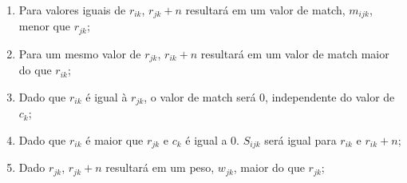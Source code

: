 \documentclass[preprint,12pt]{elsarticle}
\begin{document}
\begin{enumerate}
\item Para valores iguais de $r_{ik}$, $r_{jk} + n$ resultará em um valor de match, $m_{ijk}$, menor que $r_{jk}$;
\item Para um mesmo valor de $r_{jk}$, $r_{ik} + n$ resultará em um valor de match maior do que $r_{ik}$;
\item Dado que $r_{ik}$ é igual à $r_{jk}$, o valor de match será $0$, independente do valor de $c_{k}$;
\item Dado que $r_{ik}$ é maior que $r_{jk}$ e $c_k$ é igual a 0. $S_{ijk}$ será igual para $r_{ik}$ e $r_{ik} + n$; 
\item Dado $r_{jk}$, $r_{jk} + n$ resultará em um peso, $w_{jk}$, maior do que $r_{jk}$; 

\end{enumerate}



    
\end{document}
